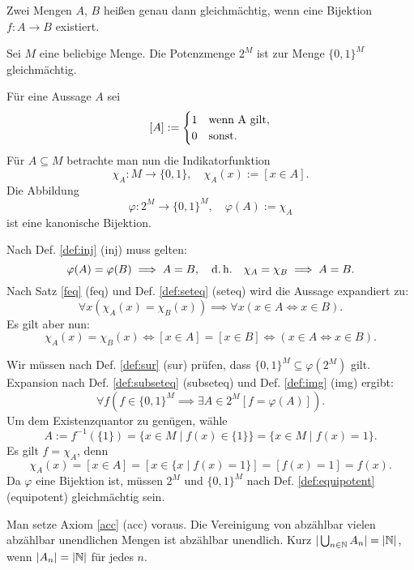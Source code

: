 \begin{Definition}%
\label{def:equipotent}
Zwei Mengen $A$, $B$ heißen genau dann gleichmächtig, wenn
eine Bijektion $f\colon A\to B$ existiert.
\end{Definition}

\begin{Satz}
Sei $M$ eine beliebige Menge. Die Potenzmenge $2^M$ ist zur
Menge $\{0,1\}^M$ gleichmächtig.
\end{Satz}

\begin{Beweis}
Für eine Aussage $A$ sei
\[[A] := \begin{cases}
1&\text{wenn }$A$\text{ gilt},\\
0&\text{sonst}.
\end{cases}\]
Für $A\subseteq M$ betrachte man nun die
Indikatorfunktion
\[\chi_A\colon M\to\{0,1\},\quad \chi_A(x):=[x\in A].\]
Die Abbildung
\[\varphi\colon 2^M\to \{0,1\}^M,\quad \varphi(A):=\chi_A\]
ist eine kanonische Bijektion.

Nach Def. \ref{def:inj} (inj) muss gelten:
\[\varphi(A)=\varphi(B)\implies A=B,\quad\text{d.\,h.}\quad
\chi_A=\chi_B \implies A=B.\]
Nach Satz \ref{feq} (feq) und Def. \ref{def:seteq} (seteq)
wird die Aussage expandiert zu:
\[\forall x(\chi_A(x)=\chi_B(x))\implies \forall x(x\in A\iff x\in B).\]
Es gilt aber nun:
\[\chi_A(x)=\chi_B(x)\iff [x\in A]=[x\in B] \iff (x\in A\iff x\in B).\]
\end{Beweis}
 Wir müssen nach Def. \ref{def:sur} (sur)
prüfen, dass $\{0,1\}^M\subseteq \varphi(2^M)$ gilt.
Expansion nach Def. \ref{def:subseteq} (subseteq) und
Def. \ref{def:img} (img)
ergibt:
\[\forall f(f\in \{0,1\}^M\implies\exists A{\in}2^M[f=\varphi(A)]).\]
Um dem Existenzquantor zu genügen, wähle
\[A := f^{-1}(\{1\}) = \{x\in M\mid f(x)\in \{1\}\} = \{x\in M\mid f(x)=1\}.\]
Es gilt $f=\chi_A$, denn
\[\chi_A(x) = [x\in A] = [x\in\{x\mid f(x)=1\}] = [f(x)=1] = f(x).\]
Da $\varphi$ eine Bijektion ist, müssen $2^M$ und $\{0,1\}^M$
nach Def. \ref{def:equipotent} (equipotent) gleichmächtig
sein.\,\qedsymbol

\newpage
\begin{Satz}\label{countable-union-countable}
Man setze Axiom \ref{acc} (acc) voraus.
Die Vereinigung von abzählbar vielen abzählbar unendlichen Mengen
ist abzählbar unendlich. Kurz $|\bigcup_{n\in\mathbb N} A_n| = |\mathbb N|$, wenn
$|A_n|=|\mathbb N|$ für jedes $n$.
\end{Satz}

